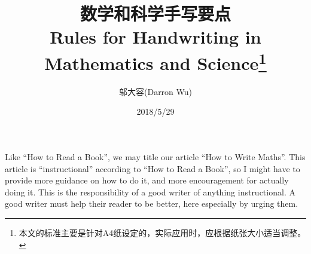 \documentclass[11pt, a4paper, titlepage]{article}
\begin{document}
\title{数学和科学手写要点\\
\centering
{\Large Rules for Handwriting in Mathematics and Science\footnote{本文的标准主要是针对A4纸设定的，实际应用时，应根据纸张大小适当调整。}}}
\author{邬大容(Darron Wu)}
\date{2018/5/29}
\maketitle

Like ``How to Read a Book'', we may title our article ``How to Write Maths''.
This article is ``instructional'' according to ``How to Read a Book'', so I might have to provide more guidance on how to do it, and more encouragement for actually doing it. This is the responsibility of a good writer of anything instructional. A good writer must help their reader to be better, here especially by urging them.
\end{document}
